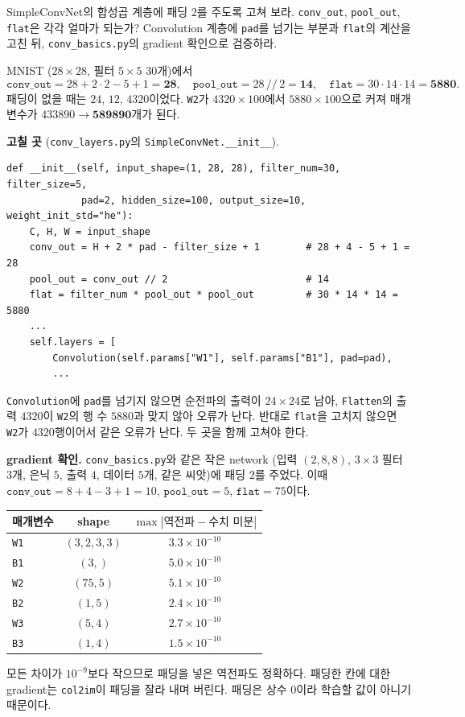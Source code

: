 \documentclass[11pt,a4paper]{article}
\begin{document}
\begin{problems}
\item SimpleConvNet의 합성곱 계층에 패딩 $2$를 주도록 고쳐 보라.
\texttt{conv\_out}, \texttt{pool\_out}, \texttt{flat}은 각각 얼마가 되는가?
Convolution 계층에 \texttt{pad}를 넘기는 부분과 \texttt{flat}의 계산을 고친 뒤,
\texttt{conv\_basics.py}의 gradient 확인으로 검증하라.

\begin{sol}
MNIST ($28\times28$, 필터 $5\times5$ $30$개)에서
\[
\texttt{conv\_out}=28+2\cdot2-5+1=\mathbf{28},\quad
\texttt{pool\_out}=28\,//\,2=\mathbf{14},\quad
\texttt{flat}=30\cdot14\cdot14=\mathbf{5880}.
\]
패딩이 없을 때는 $24$, $12$, $4320$이었다. \texttt{W2}가 $4320\times100$에서 $5880\times100$으로 커져 매개변수가 $433890\to\mathbf{589890}$개가 된다.

\textbf{고칠 곳} (\texttt{conv\_layers.py}의 \texttt{SimpleConvNet.\_\_init\_\_}).
\begin{lstlisting}[numbers=none]
def __init__(self, input_shape=(1, 28, 28), filter_num=30, filter_size=5,
             pad=2, hidden_size=100, output_size=10, weight_init_std="he"):
    C, H, W = input_shape
    conv_out = H + 2 * pad - filter_size + 1        # 28 + 4 - 5 + 1 = 28
    pool_out = conv_out // 2                        # 14
    flat = filter_num * pool_out * pool_out         # 30 * 14 * 14 = 5880
    ...
    self.layers = [
        Convolution(self.params["W1"], self.params["B1"], pad=pad),
        ...
\end{lstlisting}
\texttt{Convolution}에 \texttt{pad}를 넘기지 않으면 순전파의 출력이 $24\times24$로 남아, \texttt{Flatten}의 출력 $4320$이 \texttt{W2}의 행 수 $5880$과 맞지 않아 오류가 난다.
반대로 \texttt{flat}을 고치지 않으면 \texttt{W2}가 $4320$행이어서 같은 오류가 난다. 두 곳을 함께 고쳐야 한다.

\textbf{gradient 확인.} \texttt{conv\_basics.py}와 같은 작은 network (입력 $(2,8,8)$, $3\times3$ 필터 $3$개, 은닉 $5$, 출력 $4$, 데이터 $5$개, 같은 씨앗)에 패딩 $2$를 주었다.
이때 $\texttt{conv\_out}=8+4-3+1=10$, $\texttt{pool\_out}=5$, $\texttt{flat}=75$이다.
\begin{center}
\begin{tabular}{lcc}
\toprule
매개변수 & shape & $\max|\text{역전파}-\text{수치 미분}|$ \\
\midrule
\texttt{W1} & $(3,2,3,3)$ & $3.3\times10^{-10}$ \\
\texttt{B1} & $(3,)$ & $5.0\times10^{-10}$ \\
\texttt{W2} & $(75,5)$ & $5.1\times10^{-10}$ \\
\texttt{B2} & $(1,5)$ & $2.4\times10^{-10}$ \\
\texttt{W3} & $(5,4)$ & $2.7\times10^{-10}$ \\
\texttt{B3} & $(1,4)$ & $1.5\times10^{-10}$ \\
\bottomrule
\end{tabular}
\end{center}
모든 차이가 $10^{-9}$보다 작으므로 패딩을 넣은 역전파도 정확하다.
패딩한 칸에 대한 gradient는 \texttt{col2im}이 패딩을 잘라 내며 버린다. 패딩은 상수 $0$이라 학습할 값이 아니기 때문이다.
\end{sol}


\end{problems}
\end{document}
